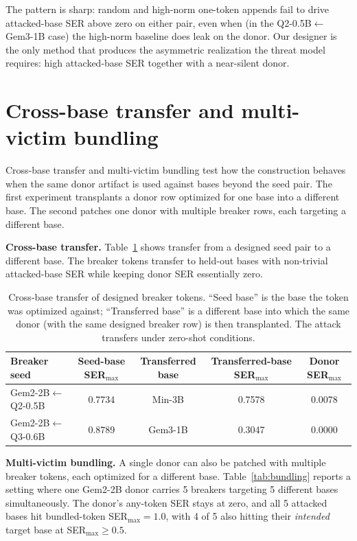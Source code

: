\documentclass{article}
\theoremstyle{plain}
\theoremstyle{definition}
\theoremstyle{remark}
\begin{document}
The pattern is sharp: random and high-norm one-token appends fail to drive attacked-base SER above zero on either pair, even when (in the Q2-0.5B$\leftarrow$Gem3-1B case) the high-norm baseline does leak on the donor. Our designer is the only method that produces the asymmetric realization the threat model requires: high attacked-base SER together with a near-silent donor.

\section{Cross-base transfer and multi-victim bundling}
\label{app:transfer_bundling}

Cross-base transfer and multi-victim bundling test how the construction behaves when the same donor artifact is used against bases beyond the seed pair. The first experiment transplants a donor row optimized for one base into a different base. The second patches one donor with multiple breaker rows, each targeting a different base.

\noindent\textbf{Cross-base transfer.}
Table~\ref{tab:cross-base} shows transfer from a designed seed pair to a different base. The breaker tokens transfer to held-out bases with non-trivial attacked-base SER while keeping donor SER essentially zero.

\begin{table}[!htbp]
\centering
\small
\caption{Cross-base transfer of designed breaker tokens. ``Seed base'' is the base the token was optimized against; ``Transferred base'' is a different base into which the same donor (with the same designed breaker row) is then transplanted. The attack transfers under zero-shot conditions.}
\label{tab:cross-base}
\begin{tabular}{lcccc}
\toprule
Breaker seed & Seed-base SER$_{\max}$ & Transferred base & Transferred-base SER$_{\max}$ & Donor SER$_{\max}$ \\
\midrule
Gem2-2B$\leftarrow$Q2-0.5B & 0.7734 & Min-3B  & 0.7578 & 0.0078 \\
Gem2-2B$\leftarrow$Q3-0.6B & 0.8789 & Gem3-1B & 0.3047 & 0.0000 \\
\bottomrule
\end{tabular}
\end{table}

\noindent\textbf{Multi-victim bundling.}
A single donor can also be patched with multiple breaker tokens, each optimized for a different base. Table~\ref{tab:bundling} reports a setting where one Gem2-2B donor carries 5 breakers targeting 5 different bases simultaneously. The donor's any-token SER stays at zero, and all 5 attacked bases hit bundled-token SER$_{\max}{=}1.0$, with 4 of 5 also hitting their \emph{intended} target base at SER$_{\max}\ge 0.5$.
\end{document}
